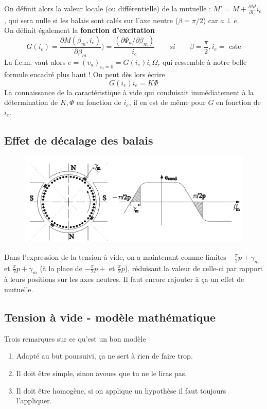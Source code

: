 		On définit alors la valeur locale (ou différentielle) de la 
		mutuelle : $\displaystyle M' = M+\frac{\partial M}{\partial 
		i_e}i_e$, qui sera nulle si les balais sont calés sur l'axe 
		neutre ($\beta = \pi/2$) car $a \perp e$. \\
		On définit également la \textbf{fonction d'excitation}
		\begin{equation}
		G(i_e) = \frac{\partial M(\beta_m,i_e)}{\partial \beta_m}) =
		\frac{(\partial \Psi_a/\partial \beta_m)}{i_e}\qquad si\qquad 
		\beta=\frac{\pi}{2}, i_e=\text{ cste}
		\end{equation}
		La f.e.m. vaut alors $e = (v_a)_{i_a=0} = G(i_e)i_e\Omega_r$ 
		qui ressemble à notre belle formule encadré plus haut ! On 
		peut dès lors écrire
		\begin{equation}
		G(i_e)i_e = K\Phi
		\end{equation}
		La connaissance de la caractéristique à vide qui conduisait 
		immédiatement à la détermination de $K, \Phi$ en fonction de 
		$i_e$, il en est de même pour $G$ en fonction de $i_e$.
		
	\newpage
	\subsection{Effet de décalage des balais}
	\begin{figure}
	\vspace{-8mm}
	\includegraphics[scale=0.5]{ch4/image8.png}
	\end{figure}
	Dans l'expression de la tension à vide, on a maintenant comme 
	limites $-\frac{\pi}{2}p+\gamma_m$ et $\frac{\pi}{2}p+\gamma_m$ (à 
	la place de $-\frac{\pi}{2}p+$ et $\frac{\pi}{2}p$), réduisant la 
	valeur de celle-ci par rapport à leurs positions sur les axes neutres. 
	Il faut encore rajouter à ça un effet de mutuelle.
	
	\subsection{Tension à vide - modèle mathématique}
	Trois remarques sur ce qu'est un bon modèle
	\begin{enumerate}
	\item Adapté au but poursuivi, ça ne sert à rien de faire trop.
	\item Il doit être simple, sinon avoues que tu ne le liras pas.
	\item Il doit être homogène, si on applique un hypothèse il faut 
	toujours l'appliquer.
	\end{enumerate}\ \\
	
